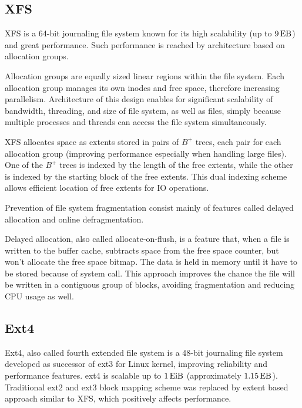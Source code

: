 \documentclass[
  color, %
  table, %
  lof,   %
  lot,   %
]{fithesis3}
\begin{document}

\subsection{XFS}
XFS is a 64-bit journaling file system known for its high scalability (up to $\SI{9}{\exa\byte}$) and great performance. Such performance is reached by architecture based on allocation groups.

Allocation groups are equally sized linear regions within the file system. Each allocation group manages its own inodes and free space, therefore increasing parallelism. Architecture of this design enables for significant scalability of bandwidth, threading, and size of file system, as well as files, simply because multiple processes and threads can access the file system simultaneously.

XFS allocates space as extents stored in pairs of $B^+$ trees, each pair for each allocation group (improving performance especially when handling large files). One of the $B^+$ trees is indexed by the length of the free extents, while the other is indexed by the starting block of the free extents. This dual indexing scheme allows efficient location of free extents for IO operations.

Prevention of file system fragmentation consist mainly of features called delayed allocation and online defragmentation.

Delayed allocation, also called allocate-on-flush, is a feature that, when a file is written to the buffer cache, subtracts space from the free space counter, but won't allocate the free space bitmap. The data is held in memory until it have to be stored because of system call. This approach improves the chance the file will be written in a contiguous group of blocks, avoiding fragmentation and reducing CPU usage as well.

\subsection{Ext4}
Ext4, also called fourth extended file system is a 48-bit journaling file system developed as successor of ext3 for Linux kernel, improving reliability and performance features. ext4 is scalable up to $\SI{1}{\exbi\byte}$ (approximately $\SI{1.15}{\exa\byte}$). Traditional ext2 and ext3 block mapping scheme was replaced by extent based approach similar to XFS, which positively affects performance.
\end{document}
